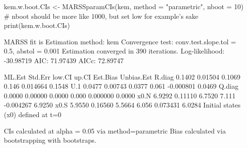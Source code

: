 \begin{Schunk}
\begin{Sinput}
 kem.w.boot.CIs <- MARSSparamCIs(kem, method = "parametric", nboot = 10)
 # nboot should be more like 1000, but set low for example's sake
 print(kem.w.boot.CIs)
\end{Sinput}
\begin{Soutput}
MARSS fit is
Estimation method: kem 
Convergence test: conv.test.slope.tol = 0.5, abstol = 0.001
Estimation converged in 390 iterations. 
Log-likelihood: -30.98719 
AIC: 71.97439   AICc: 72.89747   
 
       ML.Est Std.Err low.CI up.CI  Est.Bias Unbias.Est
R.diag 0.1402 0.01504 0.1069 0.146  0.014664     0.1548
U.1    0.0477 0.00743 0.0377 0.061 -0.000801     0.0469
Q.diag 0.0000 0.00000 0.0000 0.000  0.000000     0.0000
x0.N   6.9292 0.11110 6.7520 7.111 -0.004267     6.9250
x0.S   5.9550 0.16560 5.5664 6.056  0.073431     6.0284
Initial states (x0) defined at t=0

CIs calculated at alpha = 0.05 via method=parametric 
Bias calculated via  bootstrapping with  bootstraps. 
\end{Soutput}
\end{Schunk}
